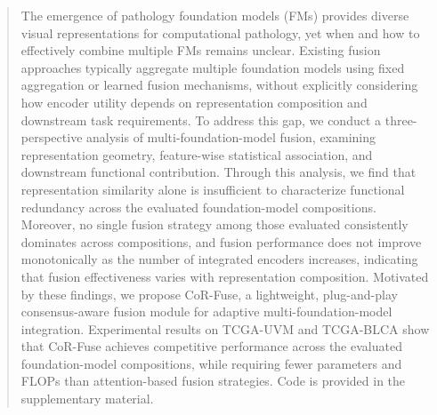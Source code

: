 \begin{abstract}
The emergence of pathology foundation models (FMs) provides diverse visual representations for computational pathology, yet when and how to effectively combine multiple FMs remains unclear. 
Existing fusion approaches typically aggregate multiple foundation models using fixed aggregation or learned fusion mechanisms, without explicitly considering how encoder utility depends on representation composition and downstream task requirements.
To address this gap, we conduct a three-perspective analysis of multi-foundation-model fusion, examining representation geometry, feature-wise statistical association, and downstream functional contribution.
Through this analysis, we find that representation similarity alone is insufficient to characterize functional redundancy across the evaluated foundation-model compositions.
Moreover, no single fusion strategy among those evaluated consistently dominates across compositions, and fusion performance does not improve monotonically as the number of integrated encoders increases, indicating that fusion effectiveness varies with representation composition.
Motivated by these findings, we propose CoR-Fuse, a lightweight, plug-and-play consensus-aware fusion module for adaptive multi-foundation-model integration. 
Experimental results on TCGA-UVM and TCGA-BLCA show that CoR-Fuse achieves competitive performance across the evaluated foundation-model compositions, while requiring fewer parameters and FLOPs than attention-based fusion strategies.
Code is provided in the supplementary material.
\end{abstract}